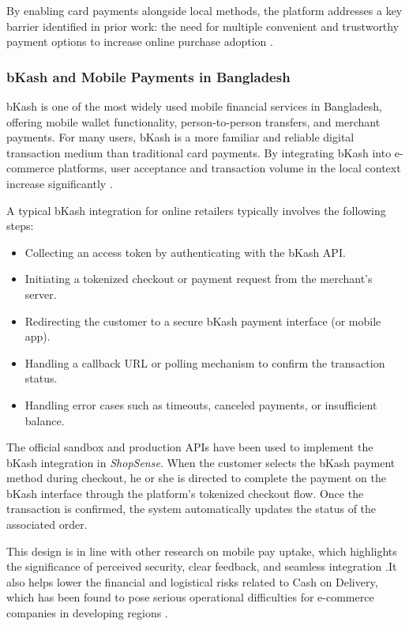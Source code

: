 By enabling card payments alongside local methods, the platform addresses a key barrier identified in prior work: the need for multiple convenient and trustworthy payment options to increase online purchase adoption \cite{hasan2021mobile}. 

\subsubsection{bKash and Mobile Payments in Bangladesh}
bKash is one of the most widely used mobile financial services in Bangladesh, offering mobile wallet functionality, person-to-person transfers, and merchant payments. For many users, bKash is a more familiar and reliable digital transaction medium than traditional card payments. By integrating bKash into e-commerce platforms, user acceptance and transaction volume in the local context increase significantly \cite{hasan2021mobile}. 

A typical bKash integration for online retailers typically involves the following steps:
\begin{itemize}
  \item Collecting an access token by authenticating with the bKash API.
  \item Initiating a tokenized checkout or payment request from the merchant’s server.
  \item Redirecting the customer to a secure bKash payment interface (or mobile app).
  \item Handling a callback URL or polling mechanism to confirm the transaction status.
  \item Handling error cases such as timeouts, canceled payments, or insufficient balance.
\end{itemize}
The official sandbox and production APIs have been used to implement the bKash integration in \textit{ShopSense}. When the customer selects the bKash payment method during checkout, he or she is directed to complete the payment on the bKash interface through the platform’s tokenized checkout flow. Once the transaction is confirmed, the system automatically updates the status of the associated order.


This design is in line with other research on mobile pay uptake, which highlights the significance of perceived security, clear feedback, and seamless integration \cite{hasan2021mobile}.It also helps lower the financial and logistical risks related to Cash on Delivery, which has been found to pose serious operational difficulties for e-commerce companies in developing regions \cite{rahman2018cod}.

